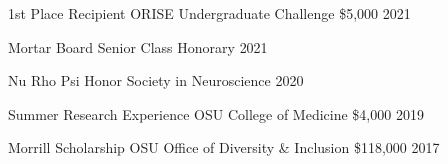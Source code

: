 

\begin{cvhonors}

\cvhonor
{1st Place Recipient} %
{ORISE Undergraduate Challenge} %
{\$5,000} %
{2021} %

 \cvhonor
    {Mortar Board} %
    {Senior Class Honorary} %
    {} %
    {2021} %

  \cvhonor
    {Nu Rho Psi} %
    {Honor Society in Neuroscience} %
    {} %
    {2020} %

  \cvhonor
    {Summer Research Experience} %
    {OSU College of Medicine} %
    {\$4,000} %
    {2019} %

  \cvhonor
    {Morrill Scholarship} %
    {OSU Office of Diversity \& Inclusion} %
    {\$118,000} %
    {2017} %


\end{cvhonors}
